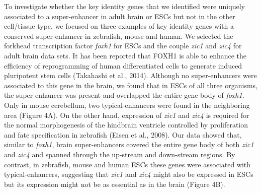 		To investigate whether the key identity genes that we identified were uniquely associated to a super-enhancer in adult brain or ESCs but not in the other cell/tissue type, we focused on three examples of key identity genes with a conserved super-enhancer in zebrafish, mouse and human. We selected the forkhead transcription factor \textit{foxh1} for ESCs and the couple \textit{zic1} and \textit{zic4} for adult brain data sets. It has been reported that FOXH1 is able to enhance the efficiency of reprogramming of human differentiated cells to generate induced pluripotent stem cells (Takahashi et al., 2014). Although no super-enhancers were associated to this gene in the brain, we found that in ESCs of all three organisms, the super-enhancer was present and overlapped the entire gene body of \textit{foxh1}. Only in mouse cerebellum, two typical-enhancers were found in the neighboring area (Figure 4A). On the other hand, expression of \textit{zic1} and \textit{zic4} is required for the normal morphogenesis of the hindbrain ventricle controlled by proliferation and fate specification in zebrafish (Eisen et al., 2008). Our data showed that, similar to \textit{foxh1}, brain super-enhancers covered the entire gene body of both \textit{zic1} and \textit{zic4}  and spanned through the up-stream and down-stream regions. By contrast, in zebrafish, mouse and human ESCs these genes were associated with typical-enhancers, suggesting that \textit{zic1} and \textit{zic4} might also be expressed in ESCs but its expression might not be as essential as in the brain (Figure 4B).\\


